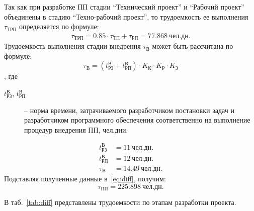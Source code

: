 \documentclass[a4paper,12pt]{article}\usepackage[]{graphicx}\usepackage[]{color}
\numberwithin{equation}{section}
\newcommand{\un}[1]{\: \mathit{#1}} %
\begin{document}
Так как при разработке ПП стадии ``Технический проект'' и ``Рабочий проект''
объединены в стадию ``Техно-рабочий проект'', то трудоемкость ее выполнения
$\tau_{ТРП}$ определяется по формуле:
\begin{align*}
  \tau_{ТРП} = 0.85 \cdot \tau_{ТП} + \tau_{РП} = 77.868 \un{чел.дн.}
\end{align*}
Трудоемкость выполнения стадии внедрения $\tau_{В}$ может быть рассчитана по
формуле:
\begin{equation}
  \tau_В = \left( t_{РЗ}^В + t_{РП}^В \right) \cdot K_К \cdot K_Р \cdot K_З
\end{equation}
, где
\begin{description}
\item[$t_{РЗ}^В$, $t_{РП}^В$] -- норма времени, затрачиваемого разработчиком
постановки задач и разработчиком программного обеспечения соответственно на
выполнение процедур внедрения ПП, чел.дни.
\end{description}
\begin{align*}
  t_{РЗ}^В &= 11 \un{чел.дн.} \\
  t_{РП}^В &= 12 \un{чел.дн.} \\
  \tau_В &= 14.49 \un{чел.дн.}
\end{align*}
Подставляя полученные данные в~\ref{eq:diff}, получим:
\begin{equation}
  \tau_{ПП} = 225.898 \un{чел.дн.}
\end{equation}

В таб.~\ref{tab:diff} представлены трудоемкости по этапам разработки проекта. 
\end{document}
